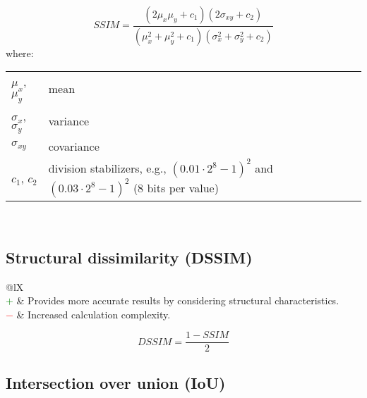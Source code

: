 \documentclass{article}
\makeatletter
\newenvironment{conditions}[1][where:]
    {\hspace{0.02\textwidth} #1 \begin{tabular}[t]{>{$}l<{$} @{${}={}$} l}}
    {\end{tabular}\\[\belowdisplayskip]}
\makeatother
\begin{document}
\begin{equation}
    \textit{SSIM} = \dfrac{(2 \mu_x \mu_y + c_1) (2 \sigma_{xy} + c_2)}{(\mu_x^2 + \mu_y^2 + c_1) (\sigma_x^2 + \sigma_y^2 + c_2)}
%
    \label{equation:SSIM}
\end{equation}
%
\begin{conditions}
    \mu_x$, $\mu_y       & mean       \\
    \sigma_x$, $\sigma_y & variance   \\
    \sigma_{xy}          & covariance \\
    c_1$, $c_2           & division stabilizers, e.g., $(0.01 \cdot 2^8 - 1)^2$ and $(0.03 \cdot 2^8 - 1)^2$ (8 bits per value)
\end{conditions}


\subsection[Structural dissimilarity (DSSIM)]{Structural dissimilarity (DSSIM) \cite{wang2004image, ghodrati2019mr}}

\begin{table}[H]\centering
    \begin{tabularx}{\textwidth}{@{}lX}
         \\
        \textcolor{Green}{$+$} & Provides more accurate results by considering structural characteristics. \cite{wang2004image} \\
        \textcolor{Red}{$-$}   & Increased calculation complexity.
    \end{tabularx}
\end{table}

\begin{equation}
    \textit{DSSIM} = \dfrac{1 - \textit{SSIM}}{2}
%
    \label{equation:DSSIM}
\end{equation}


\subsection[Intersection over union (IoU)]{Intersection over union (IoU) \cite{jaccard1912distribution, murphy1996finley, rezatofighi2019generalized, zou2023object}}
\end{document}
